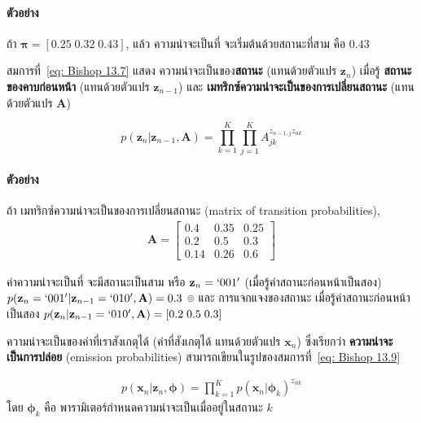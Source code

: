 \paragraph{ตัวอย่าง}
ถ้า $\bm{\pi} = [0.25 \; 0.32 \; 0.43]$, แล้ว ความน่าจะเป็นที่ จะเริ่มต้นด้วยสถานะที่สาม คือ $0.43$

สมการที่~\ref{eq: Bishop 13.7} แสดง ความน่าจะเป็นของ\textbf{สถานะ} (แทนด้วยตัวแปร $\textbf{z}_n$) เมื่อรู้ \textbf{สถานะของคาบก่อนหน้า} (แทนด้วยตัวแปร $\textbf{z}_{n-1}$) และ \textbf{เมทริกซ์ความน่าจะเป็นของการเปลี่ยนสถานะ} (แทนด้วยตัวแปร \textbf{A})

\begin{equation}
p(\textbf{z}_n | \textbf{z}_{n-1}, \textbf{A}) = \prod_{k=1}^K \prod_{j=1}^K \textit{A}_{jk}^{z_{n-1, j} z_{nk}}
\label{eq: Bishop 13.7}
\end{equation}

\paragraph{ตัวอย่าง}
ถ้า เมทริกซ์ความน่าจะเป็นของการเปลี่ยนสถานะ (matrix of transition probabilities),
\begin{eqnarray}
\textbf{A} = \left[ 
\begin{array}{ccc}
0.4 & 0.35 & 0.25 \\
0.2 & 0.5 & 0.3 \\
0.14 & 0.26 & 0.6 
\end{array} 
\right]
\nonumber
\end{eqnarray}

ค่าความน่าจะเป็นที่ จะมีสถานะเป็นสาม หรือ $\textbf{z}_n = `001'$ (เมื่อรู้ค่าสถานะก่อนหน้าเป็นสอง) 
$p(\textbf{z}_n = `001' | \textbf{z}_{n-1} = `010', \textbf{A}) = 0.3$
%
๏ และ การแจกแจงของสถานะ เมื่อรู้ค่าสถานะก่อนหน้าเป็นสอง
$p(\textbf{z}_n | \textbf{z}_{n-1} = `010', \textbf{A}) = [0.2 \; 0.5 \; 0.3]$

ความน่าจะเป็นของค่าที่เราสังเกตุได้ (ค่าที่สังเกตุได้ แทนด้วยตัวแปร $\textbf{x}_n$) ซึ่งเรียกว่า \textbf{ความน่าจะเป็นการปล่อย} (emission probabilities) สามารถเขียนในรูปของสมการที่~\ref{eq: Bishop 13.9}

\begin{eqnarray}
p(\textbf{x}_n | \textbf{z}_n, \bm{\phi}) = \prod_{k=1}^K p(\textbf{x}_n| \bm{\phi}_k)^{z_{nk}}
\label{eq: Bishop 13.9}
\end{eqnarray}
โดย $\bm{\phi}_k$ คือ พารามิเตอร์กำหนดความน่าจะเป็นเมื่ออยู่ในสถานะ $k$

